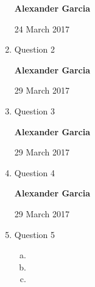 \documentclass[11pt]{article}
\begin{document}
\begin{enumerate}
\begin{enumerate}[(a)]
		\end{enumerate}

		\newpage

		\textbf{Alexander Garcia}

		24 March 2017 \\

	\item Question 2

		\newpage

		\textbf{Alexander Garcia}

		29 March 2017 \\

	\item Question 3

		\newpage

		\textbf{Alexander Garcia}

		29 March 2017 \\

	\item Question 4

		\newpage

		\textbf{Alexander Garcia}

		29 March 2017 \\

	\item Question 5

		\begin{enumerate}[(a)]

			\item

			\item

			\item

		\end{enumerate}

\end{enumerate}
\end{document}
